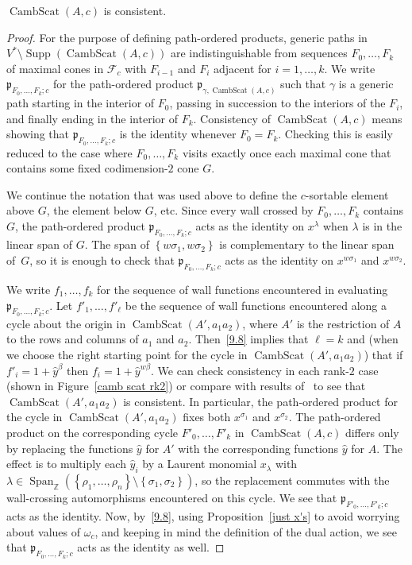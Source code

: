 \documentclass[ALCO,ThmDefs,Unicode,epreuves]{cedram}
\DeclareMathOperator{\Span}{Span}
\DeclareMathOperator{\Supp}{Supp}
\DeclareMathOperator{\CambScat}{CambScat}
\newcommand{\integers}{\mathbb Z}
\newcommand{\set}[1]{{\left\lbrace #1 \right\rbrace}}
\newcommand{\F}{{\mathcal F}}
\newcommand{\p}{{\mathfrak p}}
\newcommand{\hy}{\hat{y}}
\begin{document}
\begin{prop}\label{camb consist}
$\CambScat(A,c)$ is consistent.
\end{prop}
\begin{proof} 
For the purpose of defining path-ordered products, generic paths in $V^*\setminus\Supp(\CambScat(A,c))$ are indistinguishable from sequences $F_0,\ldots,F_k$ of maximal cones in $\F_c$ with $F_{i-1}$ and $F_i$ adjacent for $i=1,\ldots,k$.
We write $\p_{F_0,\ldots,F_k;c}$ for the path-ordered product $\p_{\gamma,\CambScat(A,c)}$ such that $\gamma$ is a generic path starting in the interior of $F_0$, passing in succession to the interiors of the $F_i$, and finally ending in the interior of $F_k$.
Consistency of $\CambScat(A,c)$ means showing that $\p_{F_0,\ldots,F_k;c}$ is the identity whenever $F_0=F_k$.
Checking this is easily reduced to the case where $F_0,\ldots,F_k$ visits exactly once each maximal cone that contains some fixed codimension-$2$ cone $G$.

We continue the notation that was used above to define the $c$-sortable element above $G$, the element below $G$, etc.
Since every wall crossed by $F_0,\ldots,F_k$ contains $G$, the path-ordered product $\p_{F_0,\ldots,F_k;c}$ acts as the identity on $x^\lambda$ when $\lambda$ is in the linear span of $G$.
The span of $\set{w\sigma_1,w\sigma_2}$ is complementary to the linear span of~$G$, so it is enough to check that $\p_{F_0,\ldots,F_k;c}$ acts as the identity on $x^{w\sigma_1}$ and $x^{w\sigma_2}$.

We write $f_1,\ldots,f_k$ for the sequence of wall functions encountered in evaluating $\p_{F_0,\ldots,F_k;c}$.
Let $f'_1,\ldots,f'_\ell$ be the sequence of wall functions encountered along a cycle about the origin in $\CambScat(A',a_1a_2)$, where $A'$ is the restriction of $A$ to the rows and columns of $a_1$ and $a_2$.
Then~\eqref{9.8} implies that $\ell=k$ and (when we choose the right starting point for the cycle in $\CambScat(A',a_1a_2)$) that if $f'_i=1+\hy^\beta$ then $f_i=1+\hy^{w\beta}$.
We can check consistency in each rank-$2$ case (shown in Figure~\ref{camb scat rk2}) or compare with results of~\cite{CGMMRSW} to see that $\CambScat(A',a_1a_2)$ is consistent.
In particular, the path-ordered product for the cycle in $\CambScat(A',a_1a_2)$ fixes both $x^{\sigma_1}$ and $x^{\sigma_2}$.
The path-ordered product on the corresponding cycle $F'_0,\ldots,F'_k$ in $\CambScat(A,c)$ differs only by replacing the functions $\hy$ for $A'$ with the corresponding functions $\hy$ for $A$.
The effect is to multiply each $\hy_i$ by a Laurent monomial $x_\lambda$ with $\lambda\in\Span_\integers(\set{\rho_1,\ldots,\rho_n}\setminus\set{\sigma_1,\sigma_2})$, so the replacement commutes with the wall-crossing automorphisms encountered on this cycle.
We see that $\p_{F'_0,\ldots,F'_k;c}$ acts as the identity.
Now, by~\eqref{9.8}, using Proposition~\ref{just x's} to avoid worrying about values of $\omega_c$, and keeping in mind the definition of the dual action, we see that $\p_{F_0,\ldots,F_k;c}$ acts as the identity as well.
\end{proof}
\end{document}
